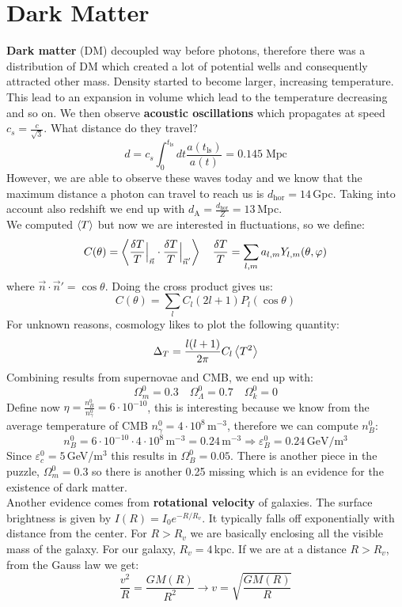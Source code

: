 \documentclass[10.75pt,a4paper,openright,bottom=2cm]{article}
\begin{document}
\section{Dark Matter}
\textbf{Dark matter} (DM) decoupled way before photons, therefore there was a distribution of DM which created a lot of potential wells and consequently attracted other mass. Density started to become larger, increasing temperature. This lead to an expansion in volume which lead to the temperature decreasing and so on. We then observe \textbf{acoustic oscillations} which propagates at speed $c_s=\frac{c}{\sqrt{3}}$. What distance do they travel?
\[
d=c_s\int_0^{t_{\text{ls}}}dt\frac{a(t_{\text{ls}})}{a(t)}=0.145\;\text{Mpc}
\]
However, we are able to observe these waves today and we know that the maximum distance a photon can travel to reach us is $d_{\text{hor}}=14$\,Gpc. Taking into account also redshift we end up with $d_{\text{A}}=\frac{d_{\text{hor}}}{Z}=13$\,Mpc.\\
We computed $\Braket{T}$ but now we are interested in fluctuations, so we define:
\[
C(\theta)=\Braket{\frac{\delta T}{T}\Bigr|_{\substack{\Vec{n}}}\cdot\frac{\delta T}{T}\Bigr|_{\substack{\Vec{n}'}}} \quad \frac{\delta T}{T}=\sum_{l,m}a_{l,m}Y_{l,m}(\theta,\varphi)
\]
where $\Vec{n}\cdot\Vec{n}'=\cos\theta$. Doing the cross product gives us:
\[
C(\theta)=\sum_lC_l(2l+1)P_l(\cos\theta)
\]
For unknown reasons, cosmology likes to plot the following quantity:
\[
\Delta_T=\frac{l(l+1)}{2\pi}C_l\Braket{T^2}
\]
Combining results from supernovae and CMB, we end up with:
\[
\Omega_m^0=0.3 \quad \Omega_\Lambda^0=0.7 \quad \Omega_k^0=0
\]
Define now $\eta=\frac{n_B^0}{n_\gamma^0}=6\cdot10^{-10}$, this is interesting because we know from the average temperature of CMB $n_\gamma^0=4\cdot10^8$\,m$^{-3}$, therefore we can compute $n_B^0$:
\[
n_B^0=6\cdot10^{-10}\cdot4\cdot10^8\,\text{m$^{-3}$}=0.24\,\text{m$^{-3}$}\Rightarrow\varepsilon_B^0=0.24\,\text{GeV/m$^3$}
\]
Since $\varepsilon_c^0=5$\,GeV/m$^3$ this results in $\Omega_B^0=0.05$. There is another piece in the puzzle, $\Omega_m^0=0.3$ so there is another 0.25 missing which is an evidence for the existence of dark matter.\\
Another evidence comes from \textbf{rotational velocity} of galaxies. The surface brightness is given by $I(R)=I_0e^{-R/R_v}$. It typically falls off exponentially with distance from the center. For $R>R_v$ we are basically enclosing all the visible mass of the galaxy. For our galaxy, $R_v=4$\,kpc. If we are at a distance $R>R_v$, from the Gauss law we get:
\[
\frac{v^2}{R}=\frac{GM(R)}{R^2}\to v=\sqrt{\frac{GM(R)}{R}}
\] 
\end{document}
